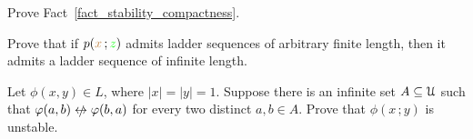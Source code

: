 \begin{exercise}
  Prove Fact~\ref{fact_stability_compactness}.
\end{exercise}

\begin{exercise}
  Prove that if $p({\color{brown} x}\,;{\color{green} z})$ admits ladder sequences of arbitrary finite length, then it admits a ladder sequence of infinite length.
\end{exercise}

\begin{exercise}
  Let $\phi(x,y)\in  L$, where $|x|=|y|=1$.
  Suppose there is an infinite set $A\subseteq\EuScript U$ such that $\phi(a,b)\niff\phi(b,a)$ for every two distinct $a,b\in A$.
  Prove that $\phi(x\,;y)$ is unstable.
\end{exercise}


  
  
  
